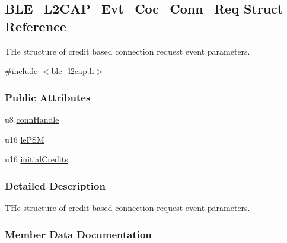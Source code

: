 \hypertarget{struct_b_l_e___l2_c_a_p___evt___coc___conn___req}{}\subsection{B\+L\+E\+\_\+\+L2\+C\+A\+P\+\_\+\+Evt\+\_\+\+Coc\+\_\+\+Conn\+\_\+\+Req Struct Reference}
\label{struct_b_l_e___l2_c_a_p___evt___coc___conn___req}


T\+He structure of credit based connection request event parameters.  




{\ttfamily \#include $<$ble\+\_\+l2cap.\+h$>$}

\subsubsection*{Public Attributes}
\begin{DoxyCompactItemize}
\item 
u8 \hyperlink{struct_b_l_e___l2_c_a_p___evt___coc___conn___req_a35247424e67ed594ad4a8bde4c911a9b}{conn\+Handle}
\item 
u16 \hyperlink{struct_b_l_e___l2_c_a_p___evt___coc___conn___req_a26b101efbd85d92e11e3fb77aa52baf3}{le\+P\+SM}
\item 
u16 \hyperlink{struct_b_l_e___l2_c_a_p___evt___coc___conn___req_a7044b7a6356cd161f03e7a4061e56ee5}{initial\+Credits}
\end{DoxyCompactItemize}


\subsubsection{Detailed Description}
T\+He structure of credit based connection request event parameters. 

\subsubsection{Member Data Documentation}
